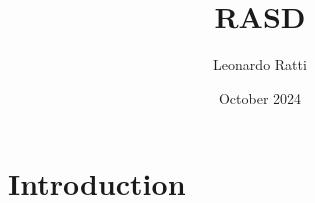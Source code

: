 \documentclass{article}
\title{RASD}
\author{Leonardo Ratti}
\date{October 2024}
\begin{document}
\maketitle

\section{Introduction}
\end{document}
